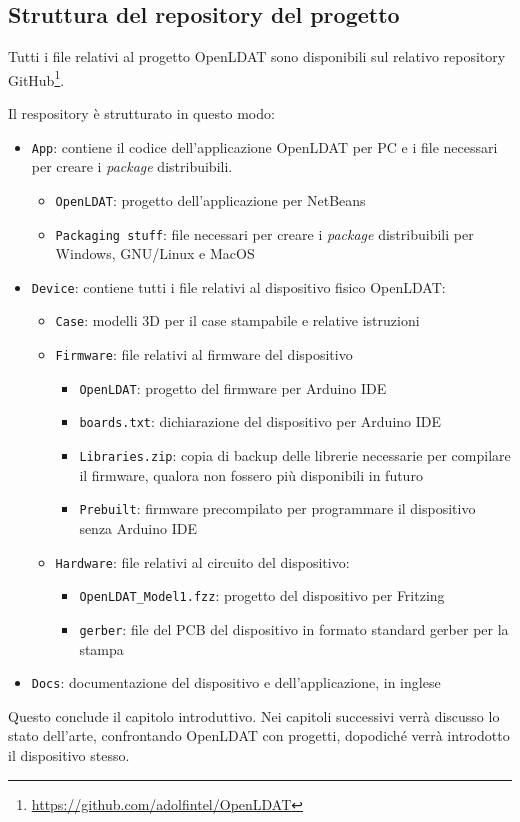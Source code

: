 \subsection{Struttura del repository del progetto}
Tutti i file relativi al progetto OpenLDAT sono disponibili sul relativo repository GitHub\footnote{\href{https://github.com/adolfintel/OpenLDAT}{https://github.com/adolfintel/OpenLDAT}}. %

Il respository è strutturato in questo modo:\begin{itemize}
	\item \texttt{App}: contiene il codice dell'applicazione OpenLDAT per PC e i file necessari per creare i \textit{package} distribuibili. \begin{itemize}
		\item \texttt{OpenLDAT}: progetto dell'applicazione per NetBeans
		\item \texttt{Packaging stuff}: file necessari per creare i \textit{package} distribuibili per Windows, GNU/Linux e MacOS
	\end{itemize}
	\item \texttt{Device}: contiene tutti i file relativi al dispositivo fisico OpenLDAT: \begin{itemize}
		\item \texttt{Case}: modelli 3D per il case stampabile e relative istruzioni
		\item \texttt{Firmware}: file relativi al firmware del dispositivo \begin{itemize}
			\item \texttt{OpenLDAT}: progetto del firmware per Arduino IDE
			\item \texttt{boards.txt}: dichiarazione del dispositivo per Arduino IDE
			\item \texttt{Libraries.zip}: copia di backup delle librerie necessarie per compilare il firmware, qualora non fossero più disponibili in futuro
			\item \texttt{Prebuilt}: firmware precompilato per programmare il dispositivo senza Arduino IDE
		\end{itemize}
		\item \texttt{Hardware}: file relativi al circuito del dispositivo: \begin{itemize}
			\item \texttt{OpenLDAT\_Model1.fzz}: progetto del dispositivo per Fritzing
			\item \texttt{gerber}: file del PCB del dispositivo in formato standard gerber per la stampa
		\end{itemize}
	\end{itemize}
	\item \texttt{Docs}: documentazione del dispositivo e dell'applicazione, in inglese
\end{itemize}

Questo conclude il capitolo introduttivo. Nei capitoli successivi verrà discusso lo stato dell'arte, confrontando OpenLDAT con progetti, dopodiché verrà introdotto il dispositivo stesso.


